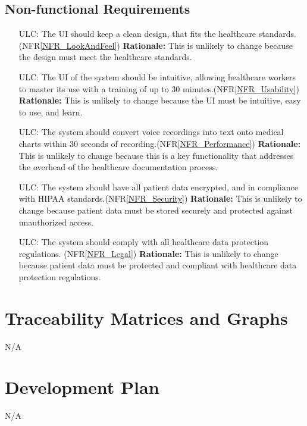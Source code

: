 \documentclass[12pt]{article}
\newcounter{lcnum} %
\newcounter{ulcnum} %
\begin{document}
\begin{itemize}
\subsection{Non-functional Requirements}
\noindent \begin{itemize}
  \item[ULC\refstepcounter{ulcnum}\theulcnum\label{ULC_LookAndFeel}:] The UI should keep a clean design, that fits the healthcare standards.(NFR\ref{NFR_LookAndFeel})
  \textbf{Rationale:} This is unlikely to change because the design must meet the healthcare standards.

  \item[ULC\refstepcounter{ulcnum}\theulcnum\label{ULC_usability}:] The UI of the system should be intuitive, allowing healthcare workers to master its use with a training of up to 30 minutes.(NFR\ref{NFR_Usability})
  \textbf{Rationale:} This is unlikely to change because the UI must be intuitive, easy to use, and learn.

  \item[ULC\refstepcounter{ulcnum}\theulcnum\label{ULC_performance}:] The system should convert voice recordings into text onto medical charts within 30 seconds of recording.(NFR\ref{NFR_Performance})
  \textbf{Rationale:} This is unlikely to change because this is a key functionality that addresses the overhead of the healthcare documentation process.

  \item[ULC\refstepcounter{ulcnum}\theulcnum\label{ULC_security}:] The system should have all patient data encrypted, and in compliance with HIPAA standards.(NFR\ref{NFR_Security})
  \textbf{Rationale:} This is unlikely to change because patient data must be stored securely and protected against unauthorized access.

  \item[ULC\refstepcounter{ulcnum}\theulcnum\label{ULC_legal}:] The system should comply with all healthcare data protection regulations. (NFR\ref{NFR_Legal})
  \textbf{Rationale:} This is unlikely to change because patient data must be protected and compliant with healthcare data protection regulations.
\end{itemize}



\section{Traceability Matrices and Graphs}
N/A   

\section{Development Plan}
N/A


\end{itemize}
\end{document}
